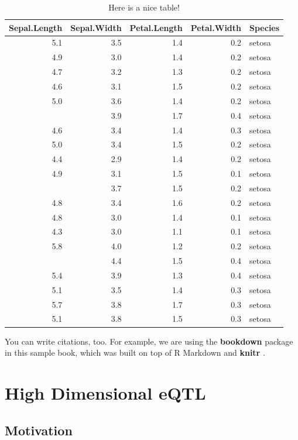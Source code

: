 \documentclass[11pt,]{book}
\theoremstyle{definition}
\theoremstyle{definition}
\theoremstyle{remark}
\begin{document}
\begin{table}

\caption{\label{tab:nice-tab}Here is a nice table!}
\centering
\begin{tabular}[t]{rrrrl}
\toprule
Sepal.Length & Sepal.Width & Petal.Length & Petal.Width & Species\\
\midrule
5.1 & 3.5 & 1.4 & 0.2 & setosa\\
4.9 & 3.0 & 1.4 & 0.2 & setosa\\
4.7 & 3.2 & 1.3 & 0.2 & setosa\\
4.6 & 3.1 & 1.5 & 0.2 & setosa\\
5.0 & 3.6 & 1.4 & 0.2 & setosa\\
\addlinespace
5.4 & 3.9 & 1.7 & 0.4 & setosa\\
4.6 & 3.4 & 1.4 & 0.3 & setosa\\
5.0 & 3.4 & 1.5 & 0.2 & setosa\\
4.4 & 2.9 & 1.4 & 0.2 & setosa\\
4.9 & 3.1 & 1.5 & 0.1 & setosa\\
\addlinespace
5.4 & 3.7 & 1.5 & 0.2 & setosa\\
4.8 & 3.4 & 1.6 & 0.2 & setosa\\
4.8 & 3.0 & 1.4 & 0.1 & setosa\\
4.3 & 3.0 & 1.1 & 0.1 & setosa\\
5.8 & 4.0 & 1.2 & 0.2 & setosa\\
\addlinespace
5.7 & 4.4 & 1.5 & 0.4 & setosa\\
5.4 & 3.9 & 1.3 & 0.4 & setosa\\
5.1 & 3.5 & 1.4 & 0.3 & setosa\\
5.7 & 3.8 & 1.7 & 0.3 & setosa\\
5.1 & 3.8 & 1.5 & 0.3 & setosa\\
\bottomrule
\end{tabular}
\end{table}

You can write citations, too. For example, we are using the
\textbf{bookdown} package \citep{R-bookdown} in this sample book, which
was built on top of R Markdown and \textbf{knitr} \citep{xie2015}.

\chapter{High Dimensional eQTL}\label{high-dimensional-eqtl}

\section{Motivation}\label{motivation}
\end{document}
